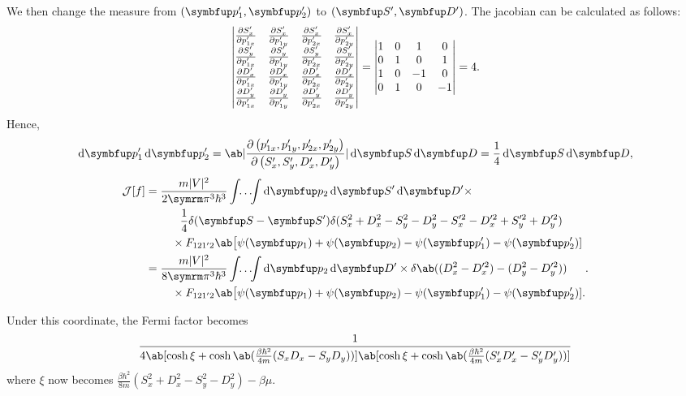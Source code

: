 We then change the measure from \((\vv{p}_1', \vv{p}_2')\) to \((\vv{S}', \vv{D}')\). The jacobian can be calculated as follows:
\begin{equation}
  \begin{vmatrix}
    \pdv{S_x'}{p_{1x}'} & \pdv{S_x'}{p_{1y}'} & \pdv{S_x'}{p_{2x}'} & \pdv{S_x'}{p_{2y}'} \\
    \pdv{S_y'}{p_{1x}'} & \pdv{S_y'}{p_{1y}'} & \pdv{S_y'}{p_{2x}'} & \pdv{S_y'}{p_{2y}'} \\
    \pdv{D_x'}{p_{1x}'} & \pdv{D_x'}{p_{1y}'} & \pdv{D_x'}{p_{2x}'} & \pdv{D_x'}{p_{2y}'} \\
    \pdv{D_y'}{p_{1x}'} & \pdv{D_y'}{p_{1y}'} & \pdv{D_y'}{p_{2x}'} & \pdv{D_y'}{p_{2y}'}
  \end{vmatrix} = \begin{vmatrix}
    1 & 0 & 1  & 0  \\
    0 & 1 & 0  & 1  \\
    1 & 0 & -1 & 0  \\
    0 & 1 & 0  & -1
  \end{vmatrix} = 4.
\end{equation}
Hence,
\begin{equation}
  \odif{\vv{p}_1',\vv{p}_2'} = \ab|\jdv{p_{1x}',p_{1y}',p_{2x}',p_{2y}'}{S_x',S_y',D_x',D_y'}|\odif{\vv{S},\vv{D}} = \frac{1}{4}\odif{\vv{S},\vv{D}},
\end{equation}
\begin{align}
  \mathcal{J}[f]
   & = \begin{multlined}[t][0.7\textwidth]
         \frac{m |V|^2}{2 \cpi^3 \hbar^3} \idotsint \odif{\vv{p}_2,\vv{S'},\vv{D}'} \times \\
         \frac{1}{4} \delta(\vv{S} - \vv{S}')\delta(S_x^2 + D_x^2 - S_y^2 - D_y^2 - S_x'^2 - D_x'^2 + S_y'^2 + D_y'^2) \\
         \times F_{121'2}\ab\big[\psi(\vv{p}_1) + \psi(\vv{p}_2) - \psi(\vv{p}_1') - \psi(\vv{p}_2')]
       \end{multlined}                       \\
   & = \begin{multlined}[t][0.7\textwidth]
         \frac{m|V|^2}{8 \cpi^3 \hbar^3} \idotsint \odif{\vv{p}_2,\vv{D}'} \times \delta\ab((D_x^2 - D_x'^2) - (D_y^2 - D_y'^2)) \\
         \times F_{121'2}\ab\big[\psi(\vv{p}_1) + \psi(\vv{p}_2) - \psi(\vv{p}_1') - \psi(\vv{p}_2')].
       \end{multlined}.
\end{align}

Under this coordinate, the Fermi factor becomes
\begin{equation}
  \frac{1}{4\ab[\cosh\xi + \cosh\ab(\frac{\beta\hbar^2}{4m}(S_x D_x - S_y D_y))]
    \ab[\cosh\xi + \cosh\ab(\frac{\beta\hbar^2}{4m}(S_x' D_x' - S_y' D_y'))]}
\end{equation}
where \(\xi\) now becomes \(\frac{\beta\hbar^2}{8m}(S_x^2 + D_x^2 - S_y^2 - D_y^2) - \beta\mu\).
